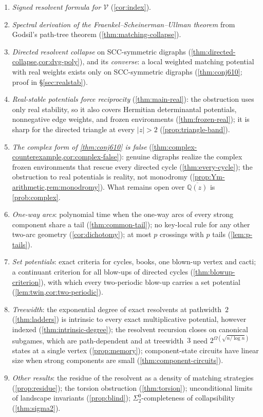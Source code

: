 \documentclass[11pt]{amsart}
\theoremstyle{plain}
\theoremstyle{definition}
\theoremstyle{remark}
\numberwithin{equation}{section}
\newcommand{\QQ}{\mathbb{Q}}
\newcommand{\Qzbar}{\overline{\QQ(z)}}
\newcommand{\val}{\mathcal{V}}            %
\begin{document}
\begin{enumerate}[label=(\arabic*)]
\item \emph{Signed resolvent formula for $\val$} (\cref{cor:index}).
\item \emph{Spectral derivation of the Fraenkel--Scheinerman--Ullman theorem} from Godsil's path-tree theorem (\cref{thm:matching-collapse}).
\item \emph{Directed resolvent collapse} on SCC-symmetric digraphs (\cref{thm:directed-collapse,cor:dvg-poly}), and its \emph{converse}: a local weighted matching potential with real weights exists only on SCC-symmetric digraphs (\cref{thm:conj610}; proof in \S\ref{sec:realstab}).
\item \emph{Real-stable potentials force reciprocity} (\cref{thm:main-real}): the obstruction uses only real stability, so it also covers Hermitian determinantal potentials, nonnegative edge weights, and frozen environments (\cref{thm:frozen-real}); it is sharp for the directed triangle at every $|z|>2$ (\cref{prop:triangle-band}).
\item \emph{The complex form of \cref{thm:conj610} is false} (\cref{thm:complex-counterexample,cor:complex-false}): genuine digraphs realize the complex frozen environments that rescue every directed cycle (\cref{thm:every-cycle}); the obstruction to real potentials is reality, not monodromy (\cref{prop:Ym-arithmetic,rem:monodromy}). What remains open over $\Qzbar$ is \cref{prob:complex}.
\item \emph{One-way arcs}: polynomial time when the one-way arcs of every strong component share a tail (\cref{thm:common-tail}); no key-local rule for any other two-arc geometry (\cref{cor:dichotomy}); at most $p$ crossings with $p$ tails (\cref{lem:p-tails}).
\item \emph{Set potentials}: exact criteria for cycles, books, one blown-up vertex and cacti; a continuant criterion for all blow-ups of directed cycles (\cref{thm:blowup-criterion}), with which every two-periodic blow-up carries a set potential (\cref{lem:twin,cor:two-periodic}).
\item \emph{Treewidth}: the exponential degree of exact resolvents at pathwidth~$2$ (\cref{thm:ladders}) is intrinsic to every exact multiplicative potential, however indexed (\cref{thm:intrinsic-degree}); the resolvent recursion closes on canonical subgames, which are path-dependent and at treewidth~$3$ need $2^{\Omega(\sqrt{n/\log n})}$ states at a single vertex (\cref{prop:memory}); component-state circuits have linear size when strong components are small (\cref{thm:component-circuits}).
\item \emph{Other results}: the residue of the resolvent as a density of matching strategies (\cref{prop:residue}); the torsion obstruction (\cref{thm:torsion}); unconditional limits of landscape invariants (\cref{prop:blind}); $\Sigma^0_2$-completeness of collapsibility (\cref{thm:sigma2}).
\end{enumerate}
\end{document}

